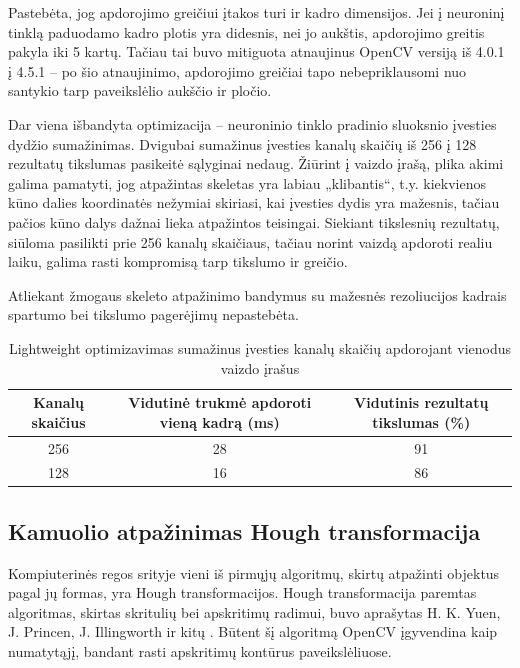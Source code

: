 \documentclass{VUMIFPSbakalaurinis}
\begin{document}
Pastebėta, jog apdorojimo greičiui įtakos turi ir kadro dimensijos. Jei į neuroninį tinklą paduodamo kadro plotis yra didesnis, nei jo aukštis, apdorojimo greitis pakyla iki 5 kartų. Tačiau tai buvo mitiguota atnaujinus OpenCV versiją iš 4.0.1 į 4.5.1 – po šio atnaujinimo, apdorojimo greičiai tapo nebepriklausomi nuo santykio tarp paveikslėlio aukščio ir pločio. 

Dar viena išbandyta optimizacija – neuroninio tinklo pradinio sluoksnio įvesties dydžio sumažinimas. Dvigubai sumažinus įvesties kanalų skaičių iš 256 į 128 rezultatų tikslumas pasikeitė sąlyginai nedaug. Žiūrint į vaizdo įrašą, plika akimi galima pamatyti, jog atpažintas skeletas yra labiau „klibantis“, t.y. kiekvienos kūno dalies koordinatės nežymiai skiriasi, kai įvesties dydis yra mažesnis, tačiau pačios kūno dalys dažnai lieka atpažintos teisingai. Siekiant tikslesnių rezultatų, siūloma pasilikti prie 256 kanalų skaičiaus, tačiau norint vaizdą apdoroti realiu laiku, galima rasti kompromisą tarp tikslumo ir greičio. 

Atliekant žmogaus skeleto atpažinimo bandymus su mažesnės rezoliucijos kadrais spartumo bei tikslumo pagerėjimų nepastebėta.

\begin{table}[H]\footnotesize
	\centering
	\caption{Lightweight optimizavimas sumažinus įvesties kanalų skaičių apdorojant vienodus vaizdo įrašus}
	{\begin{tabular}{|c|c|c|} \hline
			\textbf{Kanalų skaičius} & \textbf{Vidutinė trukmė apdoroti vieną kadrą (ms)} & \textbf{Vidutinis rezultatų tikslumas (\%)} \\
			\hline
			256  & 28    & 91       \\
			\hline
			128  & 16    & 86       \\
			\hline
	\end{tabular}}
	\label{tab:openposevslightweight}
\end{table}

\subsection{Kamuolio atpažinimas Hough transformacija}

Kompiuterinės regos srityje vieni iš pirmųjų algoritmų, skirtų atpažinti objektus pagal jų formas, yra Hough transformacijos.
Hough transformacija paremtas algoritmas, skirtas skritulių bei apskritimų radimui, buvo aprašytas H. K. Yuen, J. Princen, J. Illingworth ir kitų \cite{YUEN199071}. Būtent šį algoritmą OpenCV įgyvendina kaip numatytąjį, bandant rasti apskritimų kontūrus paveikslėliuose.
\end{document}
